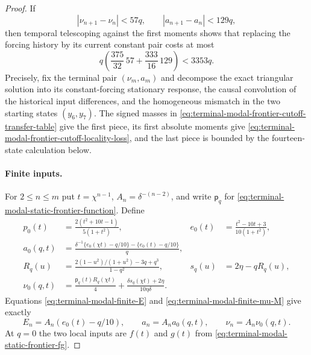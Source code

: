 \begin{proof}
If
\begin{equation}
 |\nu_{n+1}-\nu_n|<57q,
 \qquad |a_{n+1}-a_n|<129q,
 \label{eq:terminal-modal-frontier-cutoff-locality-assumed}
\end{equation}
then temporal telescoping against the first moments shows that replacing the
forcing history by its current constant pair costs at most
\begin{equation}
 q\left(\frac{375}{32}\,57+\frac{333}{16}\,129\right)<3353q.
 \label{eq:terminal-modal-frontier-cutoff-locality-loss}
\end{equation}
Precisely, fix the terminal pair $(\nu_m,a_m)$ and decompose the exact
triangular solution into its constant-forcing stationary response, the causal
convolution of the historical input differences, and the homogeneous
mismatch in the two starting states $(y_6,y_7)$.  The signed masses in
\eqref{eq:terminal-modal-frontier-cutoff-transfer-table} give the first
piece, its first absolute moments give
\eqref{eq:terminal-modal-frontier-cutoff-locality-loss}, and the last piece
is bounded by the fourteen-state calculation below.

\paragraph{Finite inputs.}
For $2\le n\le m$ put $t=\chi^{n-1}$,
$A_n=\delta^{-(n-2)}$, and write $\mathsf p_q$ for
\eqref{eq:terminal-modal-static-frontier-function}.  Define
\begin{align*}
 p_0(t)&=\frac{2(t^2+10t-1)}{5(1+t^2)},
 &e_0(t)&=\frac{t^2-10t+3}{10(1+t^2)},\\
 a_0(q,t)&=\frac{\delta^{-1}\{e_0(\chi t)-q/10\}
                    -\{e_0(t)-q/10\}}q,\\
 R_q(u)&=\frac{2(1-u^2)/(1+u^2)-3q+q^3}{1-q^2},
 &s_q(u)&=2\eta-qR_q(u),\\
 \nu_0(q,t)&=\frac{\mathsf p_q(t)R_q(\chi t)}4
 +\frac{\delta s_q(\chi t)+2\eta}{10\eta\delta}.
\end{align*}
Equations \eqref{eq:terminal-modal-finite-E} and
\eqref{eq:terminal-modal-finite-mu-M} give exactly
\begin{equation}
 E_n=A_n(e_0(t)-q/10),\qquad
 a_n=A_na_0(q,t),\qquad \nu_n=A_n\nu_0(q,t).
 \label{eq:terminal-modal-frontier-cutoff-local-inputs}
\end{equation}
At $q=0$ the two local inputs are $f(t)$ and $g(t)$ from
\eqref{eq:terminal-modal-static-frontier-fg}.


\end{proof}
